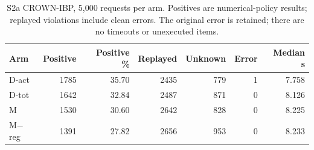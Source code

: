 \begin{table}[ht]
\centering\small
\begin{tabular}{lrrrrrr}
\toprule
Arm & Positive & Positive \% & Replayed & Unknown & Error & Median s\\
\midrule
D-act & 1785 & 35.70 & 2435 & 779 & 1 & 7.758\\
D-tot & 1642 & 32.84 & 2487 & 871 & 0 & 8.126\\
M & 1530 & 30.60 & 2642 & 828 & 0 & 8.225\\
M$-$reg & 1391 & 27.82 & 2656 & 953 & 0 & 8.233\\
\bottomrule
\end{tabular}
\caption{S2a CROWN-IBP, 5,000 requests per arm. Positives are numerical-policy results; replayed violations include clean errors. The original error is retained; there are no timeouts or unexecuted items.}
\label{tab:s2incomplete}
\end{table}
